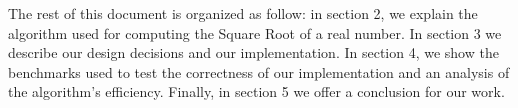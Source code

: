 The rest of this document is organized as follow: in section 2, we explain the algorithm used for computing the Square Root of a real number. In section 3 we describe our design decisions and our implementation. In section 4, we show the benchmarks used to test the correctness of our implementation and an analysis of the algorithm's efficiency. Finally, in section 5 we offer a conclusion for our work.

\clearpage
